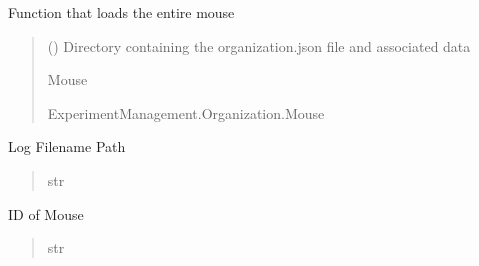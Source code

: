 \documentclass[letterpaper,10pt,english]{sphinxmanual}
\begin{document}
\begin{fulllineitems}
\begin{fulllineitems}
\label{\detokenize{Organization:Organization.Mouse.load}}
\pysigstartsignatures
{}
\pysigstopsignatures
\sphinxAtStartPar
Function that loads the entire mouse
\begin{quote}\begin{description}
\sphinxAtStartPar
{} () \textendash{} Directory containing the organization.json file and associated data

\sphinxAtStartPar
Mouse

\sphinxAtStartPar
ExperimentManagement.Organization.Mouse

\end{description}\end{quote}

\end{fulllineitems}


\begin{fulllineitems}
\label{\detokenize{Organization:Organization.Mouse.log_file}}
\pysigstartsignatures
{}
\pysigstopsignatures
\sphinxAtStartPar
Log Filename Path
\begin{quote}\begin{description}
\sphinxAtStartPar
str

\end{description}\end{quote}

\end{fulllineitems}


\begin{fulllineitems}
\label{\detokenize{Organization:Organization.Mouse.mouse_id}}
\pysigstartsignatures
{}
\pysigstopsignatures
\sphinxAtStartPar
ID of Mouse
\begin{quote}\begin{description}
\sphinxAtStartPar
str


\end{description}
\end{quote}
\end{fulllineitems}
\end{fulllineitems}
\end{document}

